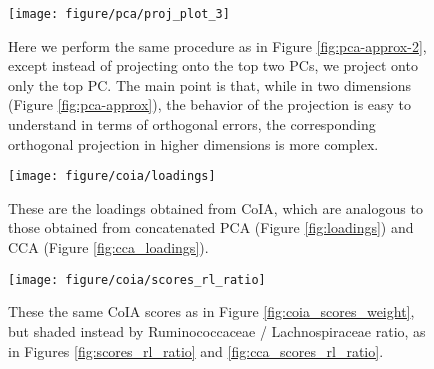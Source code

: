 \documentclass{article}
\begin{document}
\begin{figure}
  \texttt{[image: figure/pca/proj\_plot\_3]}
  \caption{Here we perform the same procedure as in Figure
    \ref{fig:pca-approx-2}, except instead of projecting onto the top two PCs,
    we project onto only the top PC. The main point is that, while in two
    dimensions (Figure \ref{fig:pca-approx}), the behavior of the projection is
    easy to understand in terms of orthogonal errors, the corresponding
    orthogonal projection in higher dimensions is more complex.
  \label{fig:pca-approx-3}}
\end{figure}

\begin{figure}[ht]
  \centering \texttt{[image: figure/coia/loadings]}
  \caption{These are the loadings obtained from CoIA, which are analogous to
    those obtained from concatenated PCA (Figure \ref{fig:loadings}) and CCA
    (Figure \ref{fig:cca_loadings}). \label{fig:coia_loadings} }
\end{figure}

\begin{figure}[ht]
  \centering
  \texttt{[image: figure/coia/scores\_rl\_ratio]}
  \caption{These the same CoIA scores as in Figure \ref{fig:coia_scores_weight},
    but shaded instead by Ruminococcaceae / Lachnospiraceae ratio, as in Figures
    \ref{fig:scores_rl_ratio} and
    \ref{fig:cca_scores_rl_ratio}. \label{fig:coia_scores_rl_ratio} }
\end{figure}
\end{document}
